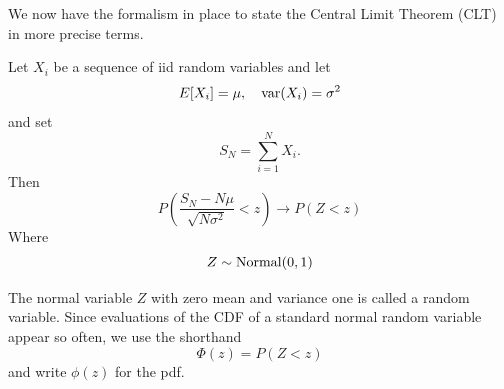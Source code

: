   
 We now have the formalism in place to state the Central Limit Theorem (CLT) in more precise terms. 
 \begin{thm} Let $X_i$ be a sequence of iid random variables and let 
 \begin{equation*}
E[X_i] = \mu,\quad  {\rm var}(X_i) = \sigma^2
 \end{equation*}
  and set 
  \begin{equation*}
 S_N = \sum_{i=1}^N X_i.
 \end{equation*}
 Then 
 \begin{equation}\label{eq:clt}
P\left( \frac{S_N-N\mu}{\sqrt{N \sigma^2}}<z\right) \to P(Z<z) 
 \end{equation}
Where
\begin{equation*}
Z \sim {\rm Normal}(0,1)
\end{equation*}
 \end{thm}
 The normal variable $Z$ with zero mean and variance one is called a  random variable. Since evaluations of the CDF of a standard normal random variable appear so often, we use the shorthand 
 \begin{equation*}
 \Phi(z) = P(Z<z)
 \end{equation*}
 and write $\phi(z)$ for the pdf. 

